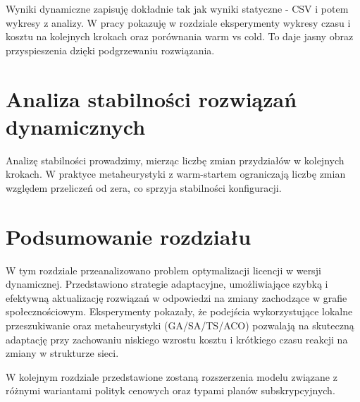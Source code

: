 Wyniki dynamiczne zapisuję dokładnie tak jak wyniki statyczne - CSV i potem wykresy z analizy. W pracy pokazuję w rozdziale eksperymenty wykresy czasu i kosztu na kolejnych krokach oraz porównania warm vs cold. To daje jasny obraz przyspieszenia dzięki podgrzewaniu rozwiązania.

\section{Analiza stabilności rozwiązań dynamicznych}

Analizę stabilności prowadzimy, mierząc liczbę zmian przydziałów w kolejnych krokach. W praktyce metaheurystyki z warm-startem ograniczają liczbę zmian względem przeliczeń od zera, co sprzyja stabilności konfiguracji.

\section{Podsumowanie rozdziału}

W tym rozdziale przeanalizowano problem optymalizacji licencji w wersji dynamicznej. Przedstawiono strategie adaptacyjne, umożliwiające szybką i efektywną aktualizację rozwiązań w odpowiedzi na zmiany zachodzące w grafie społecznościowym. Eksperymenty pokazały, że podejścia wykorzystujące lokalne przeszukiwanie oraz metaheurystyki (GA/SA/TS/ACO) pozwalają na skuteczną adaptację przy zachowaniu niskiego wzrostu kosztu i krótkiego czasu reakcji na zmiany w strukturze sieci.

W kolejnym rozdziale przedstawione zostaną rozszerzenia modelu związane z różnymi wariantami polityk cenowych oraz typami planów subskrypcyjnych.
